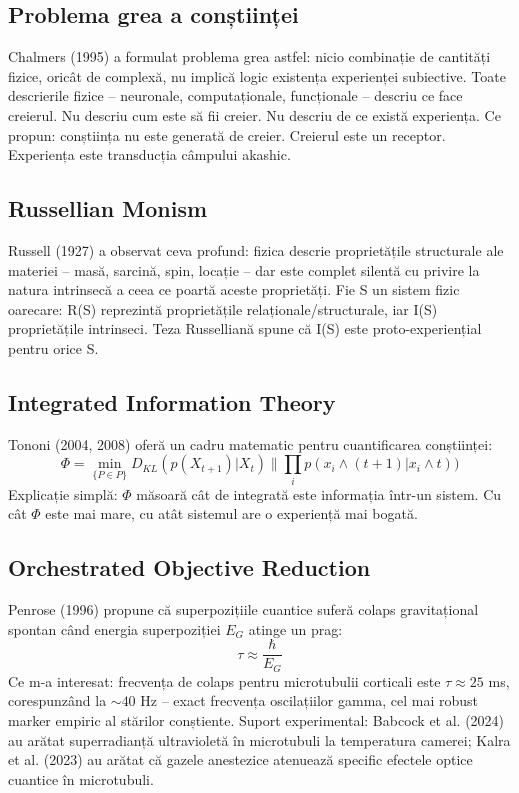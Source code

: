 \documentclass[11pt,a4paper]{article}
\begin{document}
\subsection{Problema grea a conștiinței}
Chalmers (1995) a formulat problema grea astfel: nicio combinație de cantități fizice, oricât de complexă, nu implică logic existența experienței subiective. Toate descrierile fizice – neuronale, computaționale, funcționale – descriu ce face creierul. Nu descriu cum este să fii creier. Nu descriu de ce există experiența. Ce propun: conștiința nu este generată de creier. Creierul este un receptor. Experiența este transducția câmpului akashic.

\subsection{Russellian Monism}
Russell (1927) a observat ceva profund: fizica descrie proprietățile structurale ale materiei – masă, sarcină, spin, locație – dar este complet silentă cu privire la natura intrinsecă a ceea ce poartă aceste proprietăți. Fie S un sistem fizic oarecare: R(S) reprezintă proprietățile relaționale/structurale, iar I(S) proprietățile intrinseci. Teza Russelliană spune că I(S) este proto-experiențial pentru orice S.

\subsection{Integrated Information Theory}
Tononi (2004, 2008) oferă un cadru matematic pentru cuantificarea conștiinței:
\begin{equation}
\Phi = \min_{\{P \in P\}} D_{KL}(p(X_{t+1})|X_{t}) \parallel \prod_{i} p(x_{i} \land (t+1)|x_{i} \land t))
\end{equation}
Explicație simplă: $\Phi$ măsoară cât de integrată este informația într-un sistem. Cu cât $\Phi$ este mai mare, cu atât sistemul are o experiență mai bogată.

\subsection{Orchestrated Objective Reduction}
Penrose (1996) propune că superpozițiile cuantice suferă colaps gravitațional spontan când energia superpoziției $E_G$ atinge un prag:
\begin{equation}
\tau \approx \frac{\hbar}{E_G}
\end{equation}
Ce m-a interesat: frecvența de colaps pentru microtubulii corticali este $\tau \approx 25$ ms, corespunzând la $\sim 40$ Hz – exact frecvența oscilațiilor gamma, cel mai robust marker empiric al stărilor conștiente. Suport experimental: Babcock et al. (2024) au arătat superradianță ultravioletă în microtubuli la temperatura camerei; Kalra et al. (2023) au arătat că gazele anestezice atenuează specific efectele optice cuantice în microtubuli.
\end{document}
